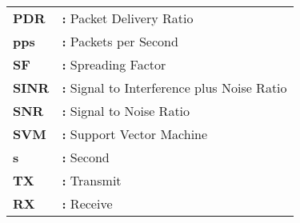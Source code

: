 \begin{tabular}{p{2cm}l}
{\bf PDR} & {\bf:} Packet Delivery Ratio\\
{\bf pps} & {\bf:} Packets per Second\\
{\bf SF} & {\bf:} Spreading Factor\\
{\bf SINR} & {\bf:} Signal to Interference plus Noise Ratio\\
{\bf SNR} & {\bf:} Signal to Noise Ratio\\
{\bf SVM} & {\bf:} Support Vector Machine\\
{\bf s} & {\bf:} Second\\
{\bf TX} & {\bf:} Transmit\\
{\bf RX} & {\bf:} Receive\\
\end{tabular}
